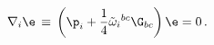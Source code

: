 \begin{equation} \label{proj2}
\nabla_{i}\e \, \equiv \, \left(\p_{i}+{1\over 4}
\tilde{\omega}_i{}^{bc}\G_{bc}\right)\e =0 \,.
\end{equation}

